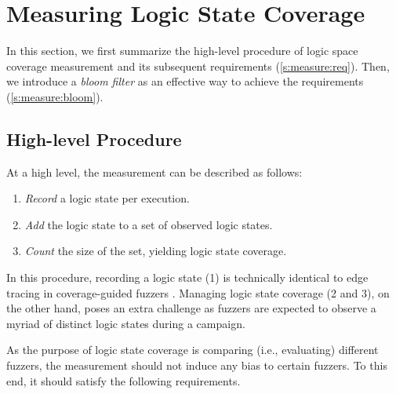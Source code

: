 \documentclass[letterpaper,twocolumn,10pt]{article}
\begin{document}
\section{Measuring Logic State Coverage}
\label{s:measure}

In this section, we first summarize the high-level procedure of logic space
coverage measurement and its subsequent requirements 
(\autoref{s:measure:req}). Then, we introduce a \emph{bloom filter} as an
effective way to achieve the requirements (\autoref{s:measure:bloom}).


\subsection{High-level Procedure}
\label{s:measure:req}


%
At a high level, the measurement can be described as follows:

\begin{enumerate}[noitemsep,label=\arabic*)]
  \item \emph{Record} a logic state per execution.
  \item \emph{Add} the logic state to a set of observed logic states.
  \item \emph{Count} the size of the set, yielding logic state coverage.
\end{enumerate}

In this procedure, recording a logic state (1) is technically identical to edge
tracing in coverage-guided fuzzers \cite{afl,fioraldi2020aflpp,libfuzzer}.
Managing logic state coverage (2 and 3), on the other hand, poses an extra
challenge as fuzzers are expected to observe a myriad of distinct logic states
during a campaign.


%
As the purpose of logic state coverage is comparing (i.e., evaluating) different
fuzzers, the measurement should not induce any bias to certain fuzzers. To this
end, it should satisfy the following requirements.
\end{document}
